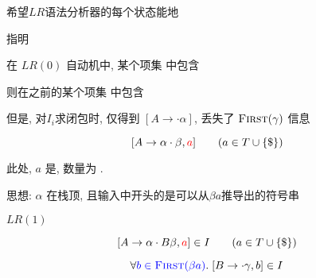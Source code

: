 \begin{frame}{}
  \begin{center}
    希望$LR$语法分析器的每个状态能地

    \vspace{0.30cm}
    指明

    \pause
    \vspace{1.00cm}
    在 $LR(0)$ 自动机中, 某个项集  中包含 

    \vspace{0.50cm}
    则在之前的某个项集  中包含 

    \vspace{0.50cm}

    \pause
    \vspace{0.80cm}
    但是, 对$I_{i}$求闭包时, 仅得到 $[A \to \cdot \alpha]$, 丢失了 $\textsc{First}(\gamma)$ 信息
  \end{center}
\end{frame}

\begin{frame}{}
  \begin{center}
    \begin{definition}[$LR(1)$项 (Item)]
      \[
        [A \to \alpha \cdot \beta, \textcolor{red}{a}] \qquad (a \in T \cup \{\$\})
      \]

      此处, $a$ 是, 数量为 .
    \end{definition}

    \pause
    \vspace{0.80cm}
    思想: $\alpha$ 在栈顶, 且输入中开头的是可以从$\beta a$推导出的符号串
  \end{center}
\end{frame}

\begin{frame}{}
  \begin{center}
    $LR(1)$

    \[
      [A \to \alpha \cdot B \beta, \textcolor{red}{a}] \in I \qquad (a \in T \cup \{\$\})
    \]

    \[
      \forall \textcolor{blue}{b \in \textsc{First}(\beta a)}.\; [B \to \cdot \gamma, b] \in I
    \]
  \end{center}
\end{frame}

